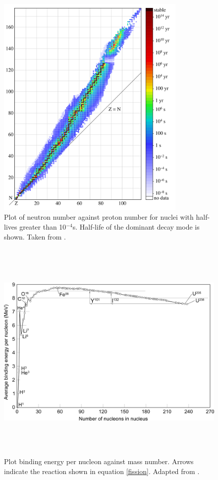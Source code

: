 \begin{figure}[htp]
\centering
\includegraphics[height=11cm]{images/Isotopes_and_half-life.png}
\caption{Plot of neutron number against proton number for nuclei with half-lives greater than 10${^{-4}}$s. Half-life of the dominant decay mode is shown. Taken from \cite{BenRGPlotIsotopes}.}
\label{figure:NZcurve}
\end{figure}

\begin{figure}[htp]
\centering
\includegraphics[height=11cm]{images/Binding_energy_curve.png}
\caption{Plot binding energy per nucleon against mass number. Arrows indicate the reaction shown in equation \ref{fission}. Adapted from \cite{FastfissionBindingCurve}.}
\label{figure:bindingenergy}
\end{figure}


